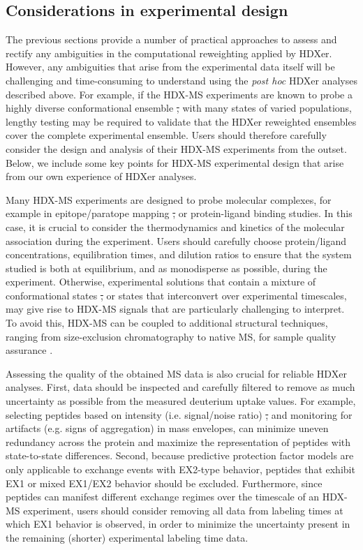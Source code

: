 \documentclass[9pt,tutorial]{livecoms}
\providecommand{\DIFdel}[1]{{\protect\color{red}\sout{#1}}}                      %
\providecommand{\DIFaddbegin}{} %
\providecommand{\DIFaddend}{} %
\providecommand{\DIFdelbegin}{} %
\providecommand{\DIFdelend}{} %
\begin{document}
\subsection{Considerations in experimental design}\DIFaddbegin \label{expt_design_sect}
\DIFaddend The previous sections provide a number of practical approaches to assess and rectify any ambiguities in the computational reweighting applied by HDXer.
However, any ambiguities that arise from the experimental data itself will be challenging and time-consuming to understand using the \textit{post hoc} HDXer analyses described above.
For example, if the HDX-MS experiments are known to probe a highly diverse conformational ensemble \DIFdelbegin \DIFdel{, }\DIFdelend with many states of varied populations, lengthy testing may be required to validate that the HDXer reweighted ensembles cover the complete experimental ensemble.
Users should therefore carefully consider the design and analysis of their HDX-MS experiments from the outset.
Below, we include some key points for HDX-MS experimental design that arise from our own experience of HDXer analyses.

Many HDX-MS experiments are designed to probe molecular complexes, for example in epitope/paratope mapping \DIFdelbegin \DIFdel{, }\DIFdelend or protein-ligand binding studies.
In this case, it is crucial to consider the thermodynamics and kinetics of the molecular association during the experiment.
Users should carefully choose protein/ligand concentrations, equilibration times, and dilution ratios to ensure that the system studied is both at equilibrium, and as monodisperse as possible, during the experiment.
Otherwise, experimental solutions that contain a mixture of conformational states \DIFdelbegin \DIFdel{, }\DIFdelend or states that interconvert over experimental timescales, may give rise to HDX-MS signals that are particularly challenging to interpret.
To avoid this, HDX-MS can be coupled to additional structural techniques, ranging from size-exclusion chromatography to native MS, for sample quality assurance \cite{Masson2019,OBrien2018}.

Assessing the quality of the obtained MS data is also crucial for reliable HDXer analyses.
First, data should be inspected and carefully filtered to remove as much uncertainty as possible from the measured deuterium uptake values.
For example, selecting peptides based on intensity (i.e. signal/noise ratio) \DIFdelbegin \DIFdel{, }\DIFdelend and monitoring for artifacts (e.g. signs of aggregation) in mass envelopes, can minimize uneven redundancy across the protein and maximize the representation of peptides with state-to-state differences.
Second, because predictive protection factor models are only applicable to exchange events with EX2-type behavior, peptides that exhibit EX1 or mixed EX1/EX2 behavior should be excluded.
Furthermore, since peptides can manifest different exchange regimes over the timescale of an HDX-MS experiment, users should consider removing all data from labeling times at which EX1 behavior is observed, in order to minimize the uncertainty present in the remaining (shorter) experimental labeling time data.
\end{document}
